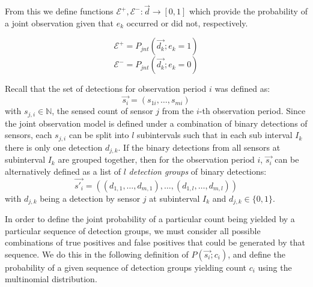 From this we define functions $\mathcal E^+, \mathcal E^- : \vec{d} \rightarrow [0,1]$ which provide the probability of a joint observation given that $e_k$ occurred or did not, respectively. 

\begin{equation}
\mathcal E^+ = P_{jnt}(\vec{d_k} ; e_k=1)
\end{equation}
\begin{equation}
\mathcal E^- = P_{jnt}(\vec{d_k} ; e_k=0)
\end{equation}



Recall that the set of detections for observation period $i$ was defined as:
\begin{equation*}
    \vec{s_i} = (s_{1i}, \ldots, s_{mi})
\end{equation*}
with $s_{j,i} \in \mathbb N$, the sensed count of sensor $j$ from the $i$-th observation period. Since the joint observation model is defined under a combination of binary detections of sensors, each $s_{j,i}$ can be split into $l$ subintervals such that in each sub interval $I_k$ there is only one detection $d_{j,k}$. If the binary detections from all sensors at subinterval $I_k$ are grouped together, then for the observation period $i$, $\vec{s_i}$ can be alternatively defined as a list of $l$ \emph{detection groups} of binary detections:
\begin{equation}
    \label{eq:s_i_definition}
    \vec{s'_i} = ((d_{1,1}, \ldots, d_{m,1}), \ldots, (d_{1,l}, \ldots, d_{m,l}))
\end{equation}
\noindent with $d_{j,k}$ being a detection by sensor $j$ at subinterval $I_k$ and $d_{j,k} \in \{0, 1\}$. 

In order to define the joint probability of a particular count being yielded by a particular sequence of detection groups, we must consider all possible combinations of true positives and false positives that could be generated by that sequence. We do this in the following definition of $P(\vec{s_i} ; c_i)$, and define the probability of a given sequence of detection groups yielding count $c_i$ using the multinomial distribution.

